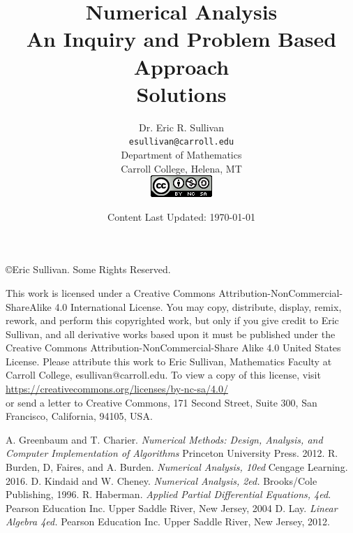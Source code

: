 \documentclass[12pt,oneside]{book}
\title{Numerical Analysis \\ An Inquiry and Problem Based Approach
    \ifnum\ShowSoln=1 {\color{red} \\ {\bf Solutions}} \fi}
\date{Content Last Updated: \today}
\author{Dr. Eric R. Sullivan \\ \texttt{esullivan@carroll.edu}\\ Department of
Mathematics \\
Carroll College, Helena, MT \\
\includegraphics{CreativeCommons.png} \\\vspace{3in}
}
\theoremstyle{definition}
\begin{document}
\maketitle
\newpage
\noindent \copyright Eric Sullivan. Some Rights Reserved.

\vspace{0.2in}
This work is licensed under a Creative Commons Attribution-NonCommercial-ShareAlike 4.0
International License.
You may copy, distribute, display, remix, rework, and perform this copyrighted work, but only if
you give credit to Eric Sullivan, and all derivative works based upon it must be published
under the Creative Commons Attribution-NonCommercial-Share Alike 4.0 United States License. Please
attribute this work to Eric Sullivan, Mathematics Faculty at Carroll College,
esullivan@carroll.edu. To view a copy of this license, visit\\
\href{https://creativecommons.org/licenses/by-nc-sa/4.0/}{https://creativecommons.org/licenses/by-nc-sa/4.0/}\\
or send a letter to Creative Commons, 171 Second Street, Suite 300, San Francisco,
California, 94105, USA.
\tableofcontents










\begin{appendix}





\end{appendix}

\begin{thebibliography}{99}
         A. Greenbaum and T. Charier. {\it Numerical Methods: Design,
            Analysis, and Computer Implementation of Algorithms} Princeton University
            Press. 2012.
         R. Burden, D, Faires, and A. Burden. {\it Numerical Analysis,
            10ed} Cengage Learning. 2016.
         D. Kindaid and W. Cheney. {\it Numerical Analysis, 2ed.}
            Brooks/Cole Publishing, 1996.
         R. Haberman. {\it Applied Partial Differential Equations,
        4ed}.  Pearson Education Inc. Upper Saddle River, New Jersey, 2004
         D. Lay. {\it Linear Algebra 4ed.} Pearson Education Inc. Upper
        Saddle River, New Jersey, 2012.
\end{thebibliography}
\end{document}
